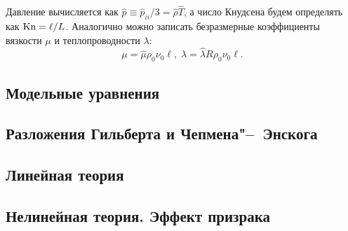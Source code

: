 Давление вычисляется как \(\hat{p} \equiv \hat{p}_{ii}/3 = \hat{\rho}\hat{T}\), а число Кнудсена будем определять как \(\mathrm{Kn}=\ell/L\).
Аналогично можно записать безразмерные коэффициенты вязкости \(\mu\) и теплопроводности \(\lambda\):
\[ \mu = \hat{\mu}\rho_0\nu_0\ell, \; \lambda = \hat{\lambda}R\rho_0\nu_0\ell. \]
 
\subsection{Модельные уравнения}

\subsection{Разложения Гильберта и Чепмена"--~Энскога}

\subsection{Линейная теория}

\subsection{Нелинейная теория. Эффект призрака}

